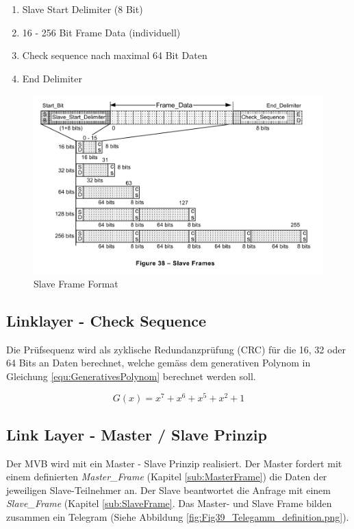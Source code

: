 \begin{enumerate}
    \item Slave Start Delimiter (8 Bit)
    \item 16 - 256 Bit Frame Data (individuell)
    \item Check sequence nach maximal 64 Bit Daten 
    \item End Delimiter
\end{enumerate}

\begin{figure}[H]
    \centering
    \includegraphics[width = 0.8 \textwidth]{Figures/Chap2/Grundlagen/MVB_DOKU/Frames und Telegramme/Fig38_SlaveFrameFormat.png}
    \caption{Slave Frame Format}
    \label{fig:SlaveFrameFormat}
\end{figure}

\subsection{Linklayer - Check Sequence}
\label{sub:CheckSequenz}
Die Prüfsequenz wird als zyklische Redundanzprüfung (CRC) für die 16, 32 oder 64 Bits an Daten berechnet, welche gemäss dem generativen Polynom in Gleichung \ref{equ:GenerativesPolynom} berechnet werden soll.

\begin{equation}
    G(x) = x^7 + x^6 + x^5 + x^2 + 1
    \label{equ:GenerativesPolynom}
\end{equation}

\subsection{Link Layer - Master / Slave Prinzip}
\label{sub:MasterSlavePrinzip}
Der MVB wird mit ein Master - Slave Prinzip realisiert. Der Master fordert mit einem definierten \textit{Master\_Frame} (Kapitel \ref{sub:MasterFrame}) die Daten der jeweiligen Slave-Teilnehmer an. Der Slave beantwortet die Anfrage mit einem \textit{Slave\_Frame} (Kapitel \ref{sub:SlaveFrame}. Das Master- und Slave Frame bilden zusammen ein Telegram (Siehe Abbildung \ref{fig:Fig39_Telegamm_definition.png}). 

